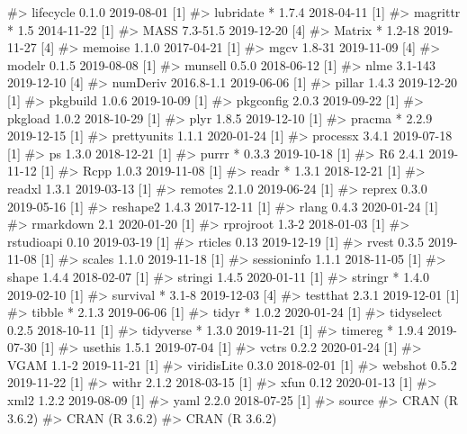 \documentclass[
]{jss}
\begin{document}
\begin{CodeChunk}
\begin{CodeOutput}
#>  lifecycle     0.1.0      2019-08-01 [1]
#>  lubridate   * 1.7.4      2018-04-11 [1]
#>  magrittr    * 1.5        2014-11-22 [1]
#>  MASS          7.3-51.5   2019-12-20 [4]
#>  Matrix      * 1.2-18     2019-11-27 [4]
#>  memoise       1.1.0      2017-04-21 [1]
#>  mgcv          1.8-31     2019-11-09 [4]
#>  modelr        0.1.5      2019-08-08 [1]
#>  munsell       0.5.0      2018-06-12 [1]
#>  nlme          3.1-143    2019-12-10 [4]
#>  numDeriv      2016.8-1.1 2019-06-06 [1]
#>  pillar        1.4.3      2019-12-20 [1]
#>  pkgbuild      1.0.6      2019-10-09 [1]
#>  pkgconfig     2.0.3      2019-09-22 [1]
#>  pkgload       1.0.2      2018-10-29 [1]
#>  plyr          1.8.5      2019-12-10 [1]
#>  pracma      * 2.2.9      2019-12-15 [1]
#>  prettyunits   1.1.1      2020-01-24 [1]
#>  processx      3.4.1      2019-07-18 [1]
#>  ps            1.3.0      2018-12-21 [1]
#>  purrr       * 0.3.3      2019-10-18 [1]
#>  R6            2.4.1      2019-11-12 [1]
#>  Rcpp          1.0.3      2019-11-08 [1]
#>  readr       * 1.3.1      2018-12-21 [1]
#>  readxl        1.3.1      2019-03-13 [1]
#>  remotes       2.1.0      2019-06-24 [1]
#>  reprex        0.3.0      2019-05-16 [1]
#>  reshape2      1.4.3      2017-12-11 [1]
#>  rlang         0.4.3      2020-01-24 [1]
#>  rmarkdown     2.1        2020-01-20 [1]
#>  rprojroot     1.3-2      2018-01-03 [1]
#>  rstudioapi    0.10       2019-03-19 [1]
#>  rticles       0.13       2019-12-19 [1]
#>  rvest         0.3.5      2019-11-08 [1]
#>  scales        1.1.0      2019-11-18 [1]
#>  sessioninfo   1.1.1      2018-11-05 [1]
#>  shape         1.4.4      2018-02-07 [1]
#>  stringi       1.4.5      2020-01-11 [1]
#>  stringr     * 1.4.0      2019-02-10 [1]
#>  survival    * 3.1-8      2019-12-03 [4]
#>  testthat      2.3.1      2019-12-01 [1]
#>  tibble      * 2.1.3      2019-06-06 [1]
#>  tidyr       * 1.0.2      2020-01-24 [1]
#>  tidyselect    0.2.5      2018-10-11 [1]
#>  tidyverse   * 1.3.0      2019-11-21 [1]
#>  timereg     * 1.9.4      2019-07-30 [1]
#>  usethis       1.5.1      2019-07-04 [1]
#>  vctrs         0.2.2      2020-01-24 [1]
#>  VGAM          1.1-2      2019-11-21 [1]
#>  viridisLite   0.3.0      2018-02-01 [1]
#>  webshot       0.5.2      2019-11-22 [1]
#>  withr         2.1.2      2018-03-15 [1]
#>  xfun          0.12       2020-01-13 [1]
#>  xml2          1.2.2      2019-08-09 [1]
#>  yaml          2.2.0      2018-07-25 [1]
#>  source                                  
#>  CRAN (R 3.6.2)                          
#>  CRAN (R 3.6.2)                          
#>  CRAN (R 3.6.2)                          

\end{CodeOutput}
\end{CodeChunk}
\end{document}
